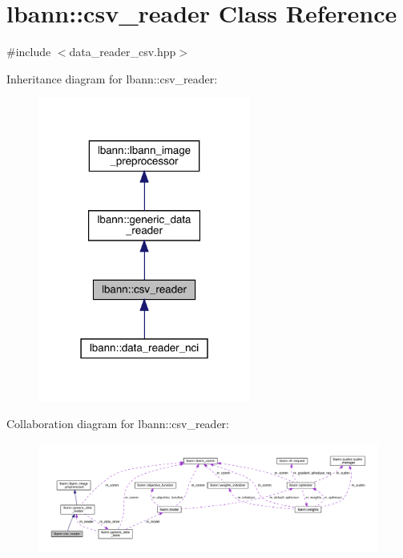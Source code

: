 \hypertarget{classlbann_1_1csv__reader}{}\section{lbann\+:\+:csv\+\_\+reader Class Reference}
\label{classlbann_1_1csv__reader}


{\ttfamily \#include $<$data\+\_\+reader\+\_\+csv.\+hpp$>$}



Inheritance diagram for lbann\+:\+:csv\+\_\+reader\+:\nopagebreak
\begin{figure}[H]
\begin{center}
\leavevmode
\includegraphics[width=198pt]{classlbann_1_1csv__reader__inherit__graph}
\end{center}
\end{figure}


Collaboration diagram for lbann\+:\+:csv\+\_\+reader\+:\nopagebreak
\begin{figure}[H]
\begin{center}
\leavevmode
\includegraphics[width=350pt]{classlbann_1_1csv__reader__coll__graph}
\end{center}
\end{figure}
